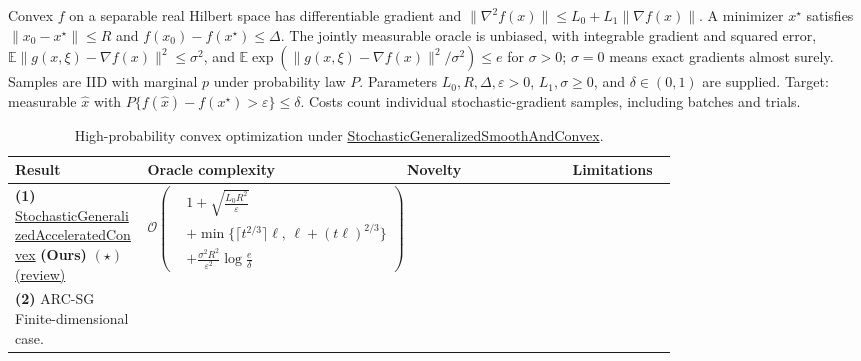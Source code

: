 \begin{table}[tp]
\centering
\caption{High-probability convex optimization under \href{https://github.com/k3nfalt/longtails/blob/main/LongTails/Setups/StochasticGeneralizedSmoothAndConvex.lean}{StochasticGeneralizedSmoothAndConvex}.}\label{tab:StochasticGeneralizedSmoothAndConvex}
\parbox{\linewidth}{\footnotesize Convex $f$ on a separable real Hilbert space has differentiable gradient and $\|\nabla^2 f(x)\|\le L_0+L_1\|\nabla f(x)\|$. A minimizer $x^\star$ satisfies $\|x_0-x^\star\|\le R$ and $f(x_0)-f(x^\star)\le\Delta$. The jointly measurable oracle is unbiased, with integrable gradient and squared error, $\mathbb E\|g(x,\xi)-\nabla f(x)\|^2\le\sigma^2$, and $\mathbb E\exp(\|g(x,\xi)-\nabla f(x)\|^2/\sigma^2)\le e$ for $\sigma>0$; $\sigma=0$ means exact gradients almost surely. Samples are IID with marginal $p$ under probability law $P$. Parameters $L_0,R,\Delta,\varepsilon>0$, $L_1,\sigma\ge0$, and $\delta\in(0,1)$ are supplied. Target: measurable $\hat x$ with $P\{f(\hat x)-f(x^\star)>\varepsilon\}\le\delta$. Costs count individual stochastic-gradient samples, including batches and trials.}\par\smallskip
\begin{threeparttable}
\footnotesize
\setlength{\tabcolsep}{4pt}\renewcommand{\arraystretch}{1.25}
\begin{tabularx}{\linewidth}{@{}>{\raggedright\arraybackslash}p{0.20\linewidth}>{\raggedright\arraybackslash}p{0.32\linewidth}>{\raggedright\arraybackslash}p{0.25\linewidth}>{\raggedright\arraybackslash}X@{}}
\toprule
\textbf{Result} & \textbf{Oracle complexity} & \textbf{Novelty} & \textbf{Limitations} \\
\midrule
\textbf{(1)} \href{https://github.com/k3nfalt/longtails/blob/main/LongTails/Theorems/StochasticGeneralizedAcceleratedConvex.lean}{Stochastic\allowbreak Generalized\allowbreak Accelerated\allowbreak Convex} \textbf{(Ours)} $(\star)$ \href{https://github.com/k3nfalt/longtails/blob/main/scripts/reviews/StochasticGeneralizedAcceleratedConvex.md}{(review)}
& $\displaystyle\mathcal{O}\!\left(\begin{aligned}&1+\sqrt{\frac{L_0R^2}{\varepsilon}}\\&+\min\{\lceil t^{2/3}\rceil\ell,\,\ell+(t\ell)^{2/3}\}\\&+\frac{\sigma^2R^2}{\varepsilon^2}\log\frac e\delta\end{aligned}\right)$
& & \\
\midrule[1.2pt]
\textbf{(2)} ARC-SG \citep[Thm.~3]{gssgDvinskikh2026}\newline Finite-dimensional case.

\end{tabularx}
\end{threeparttable}
\end{table}
